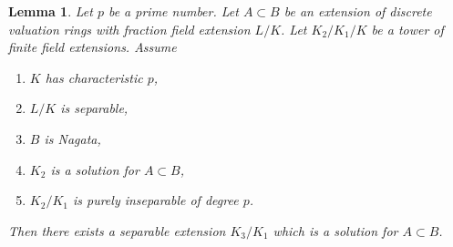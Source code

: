 \documentclass[10pt,a4paper]{amsart}
\theoremstyle{plain}
\newtheorem{lemma}[subsection]{Lemma}
\theoremstyle{definition}
\theoremstyle{remark}
\numberwithin{equation}{subsection}
\begin{document}
\begin{lemma}
\label{lemma-approximate-solution}
Let $p$ be a prime number. Let $A \subset B$ be an extension of discrete
valuation rings with fraction field extension $L/K$. Let $K_2/K_1/K$ be
a tower of finite field extensions. Assume
\begin{enumerate}
\item $K$ has characteristic $p$,
\item $L/K$ is separable,
\item $B$ is Nagata,
\item $K_2$ is a solution for $A \subset B$,
\item $K_2/K_1$ is purely inseparable of degree $p$.
\end{enumerate}
Then there exists a separable extension $K_3/K_1$
which is a solution for $A \subset B$.
\end{lemma}
\end{document}
